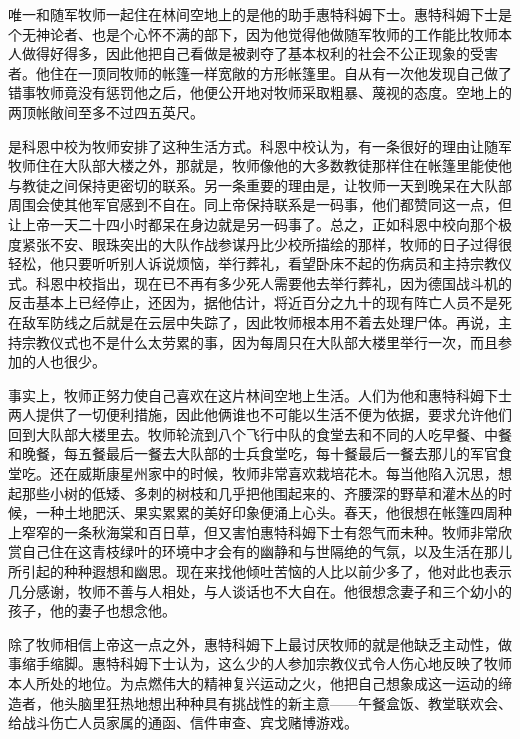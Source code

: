     唯一和随军牧师一起住在林间空地上的是他的助手惠特科姆下士。惠特科姆下士是个无神论者、也是个心怀不满的部下，因为他觉得他做随军牧师的工作能比牧师本人做得好得多，因此他把自己看做是被剥夺了基本权利的社会不公正现象的受害者。他住在一顶同牧师的帐篷一样宽敞的方形帐篷里。自从有一次他发现自己做了错事牧师竟没有惩罚他之后，他便公开地对牧师采取粗暴、蔑视的态度。空地上的两顶帐敞间至多不过四五英尺。

 


    是科恩中校为牧师安排了这种生活方式。科恩中校认为，有一条很好的理由让随军牧师住在大队部大楼之外，那就是，牧师像他的大多数教徒那样住在帐篷里能使他与教徒之间保持更密切的联系。另一条重要的理由是，让牧师一天到晚呆在大队部周围会使其他军官感到不自在。同上帝保持联系是一码事，他们都赞同这一点，但让上帝一天二十四小时都呆在身边就是另一码事了。总之，正如科恩中校向那个极度紧张不安、眼珠突出的大队作战参谋丹比少校所描绘的那样，牧师的日子过得很轻松，他只要听听别人诉说烦恼，举行葬礼，看望卧床不起的伤病员和主持宗教仪式。科恩中校指出，现在已不再有多少死人需要他去举行葬礼，因为德国战斗机的反击基本上已经停止，还因为，据他估计，将近百分之九十的现有阵亡人员不是死在敌军防线之后就是在云层中失踪了，因此牧师根本用不着去处理尸体。再说，主持宗教仪式也不是什么太劳累的事，因为每周只在大队部大楼里举行一次，而且参加的人也很少。

    事实上，牧师正努力使自己喜欢在这片林间空地上生活。人们为他和惠特科姆下士两人提供了一切便利措施，因此他俩谁也不可能以生活不便为依据，要求允许他们回到大队部大楼里去。牧师轮流到八个飞行中队的食堂去和不同的人吃早餐、中餐和晚餐，每五餐最后一餐去大队部的士兵食堂吃，每十餐最后一餐去那儿的军官食堂吃。还在威斯康星州家中的时候，牧师非常喜欢栽培花木。每当他陷入沉思，想起那些小树的低矮、多刺的树枝和几乎把他围起来的、齐腰深的野草和灌木丛的时候，一种土地肥沃、果实累累的美好印象便涌上心头。春天，他很想在帐篷四周种上窄窄的一条秋海棠和百日草，但又害怕惠特科姆下士有怨气而未种。牧师非常欣赏自己住在这青枝绿叶的环境中才会有的幽静和与世隔绝的气氛，以及生活在那儿所引起的种种遐想和幽思。现在来找他倾吐苦恼的人比以前少多了，他对此也表示几分感谢，牧师不善与人相处，与人谈话也不大自在。他很想念妻子和三个幼小的孩子，他的妻子也想念他。

    除了牧师相信上帝这一点之外，惠特科姆下上最讨厌牧师的就是他缺乏主动性，做事缩手缩脚。惠特科姆下士认为，这么少的人参加宗教仪式令人伤心地反映了牧师本人所处的地位。为点燃伟大的精神复兴运动之火，他把自己想象成这一运动的缔造者，他头脑里狂热地想出种种具有挑战性的新主意——午餐盒饭、教堂联欢会、给战斗伤亡人员家属的通函、信件审查、宾戈赌博游戏。

 


